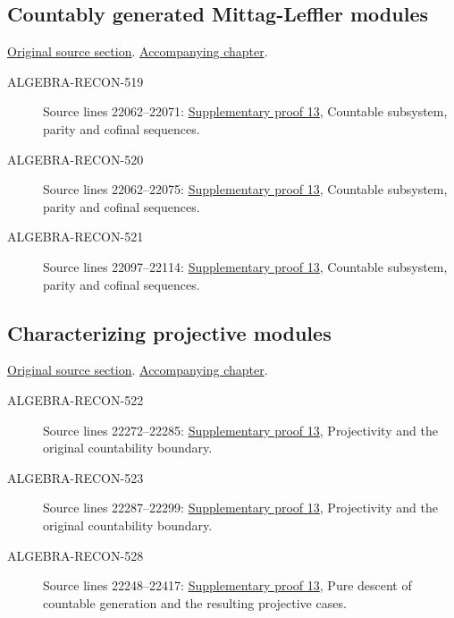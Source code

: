 \subsection{Countably generated Mittag-Leffler modules}
\hypertarget{algebra-source-section-ML-countable}{}
\noindent\href{https://github.com/stacks/stacks-project/blob/a04446e57ec1fbc252a871afcec7752fb2807b14/algebra.tex\#L22045}{Original source section}. \href{algebra.pdf\#nameddest=section-ML-countable}{Accompanying chapter}.

\begin{description}
\item[ALGEBRA-RECON-519] Source lines 22062--22071: \hyperlink{algebra_ml_coherent_notes_20260927}{Supplementary proof 13}, Countable subsystem, parity and cofinal sequences.
\item[ALGEBRA-RECON-520] Source lines 22062--22075: \hyperlink{algebra_ml_coherent_notes_20260927}{Supplementary proof 13}, Countable subsystem, parity and cofinal sequences.
\item[ALGEBRA-RECON-521] Source lines 22097--22114: \hyperlink{algebra_ml_coherent_notes_20260927}{Supplementary proof 13}, Countable subsystem, parity and cofinal sequences.
\end{description}

\subsection{Characterizing projective modules}
\hypertarget{algebra-source-section-characterize-projective}{}
\noindent\href{https://github.com/stacks/stacks-project/blob/a04446e57ec1fbc252a871afcec7752fb2807b14/algebra.tex\#L22184}{Original source section}. \href{algebra.pdf\#nameddest=section-characterize-projective}{Accompanying chapter}.

\begin{description}
\item[ALGEBRA-RECON-522] Source lines 22272--22285: \hyperlink{algebra_ml_coherent_notes_20260927}{Supplementary proof 13}, Projectivity and the original countability boundary.
\item[ALGEBRA-RECON-523] Source lines 22287--22299: \hyperlink{algebra_ml_coherent_notes_20260927}{Supplementary proof 13}, Projectivity and the original countability boundary.
\item[ALGEBRA-RECON-528] Source lines 22248--22417: \hyperlink{algebra_ml_coherent_notes_20260927}{Supplementary proof 13}, Pure descent of countable generation and the resulting projective cases.
\end{description}


